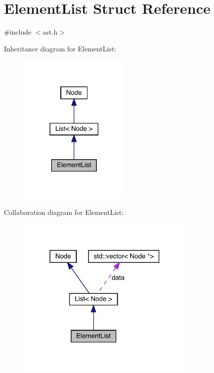 \hypertarget{struct_element_list}{}\section{Element\+List Struct Reference}
\label{struct_element_list}


{\ttfamily \#include $<$ast.\+h$>$}



Inheritance diagram for Element\+List\+:
\nopagebreak
\begin{figure}[H]
\begin{center}
\leavevmode
\includegraphics[width=153pt]{struct_element_list__inherit__graph}
\end{center}
\end{figure}


Collaboration diagram for Element\+List\+:
\nopagebreak
\begin{figure}[H]
\begin{center}
\leavevmode
\includegraphics[width=246pt]{struct_element_list__coll__graph}
\end{center}
\end{figure}
